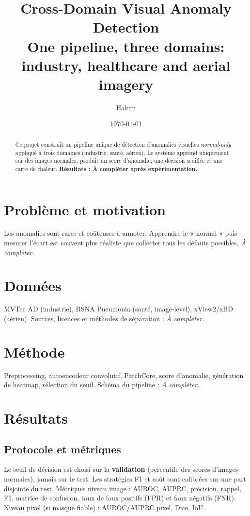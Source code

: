\documentclass[11pt,a4paper]{article}
\title{Cross-Domain Visual Anomaly Detection\\
\large One pipeline, three domains: industry, healthcare and aerial imagery}
\author{Hakim}
\date{\today}
\begin{document}
\maketitle

\begin{abstract}
Ce projet construit un pipeline unique de détection d'anomalies visuelles
\emph{normal-only} appliqué à trois domaines (industrie, santé, aérien). Le
système apprend uniquement sur des images normales, produit un score
d'anomalie, une décision seuillée et une carte de chaleur.
\textbf{Résultats : À compléter après expérimentation.}
\end{abstract}

\section{Problème et motivation}
Les anomalies sont rares et coûteuses à annoter. Apprendre le
« normal » puis mesurer l'écart est souvent plus réaliste que collecter tous
les défauts possibles. \emph{À compléter.}

\section{Données}
MVTec AD (industrie), RSNA Pneumonia (santé, image-level), xView2/xBD
(aérien). Sources, licences et méthodes de séparation : \emph{À compléter.}

\section{Méthode}
Preprocessing, autoencodeur convolutif, PatchCore, score d'anomalie,
génération de heatmap, sélection du seuil. Schéma du pipeline : \emph{À
compléter.}

\section{Résultats}

\subsection{Protocole et métriques}
Le seuil de décision est choisi sur la \textbf{validation} (percentile des
scores d'images normales), jamais sur le test. Les stratégies F1 et coût sont
calibrées sur une part disjointe du test. Métriques niveau image : AUROC,
AUPRC, précision, rappel, F1, matrice de confusion, taux de faux positifs
(FPR) et faux négatifs (FNR). Niveau pixel (si masque fiable) : AUROC/AUPRC
pixel, Dice, IoU.
\end{document}
